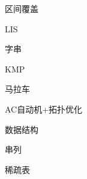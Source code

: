 \documentclass{article}
\begin{document}
\begin{enumerate}

{\bf \LARGE \item  字串}

	\begin{itemize}
	
	{\bf \item KMP}
		
	
	{\bf \item 马拉车}
		
	
	{\bf \item AC自动机+拓扑优化}
	
		
	
	\end{itemize}

{\bf \LARGE \item  数据结构}

	\begin{itemize}
	
	{\bf \item 串列}
		
	
	{\bf \item 稀疏表}
				
	
	\end{itemize}



\end{enumerate}
\end{document}
